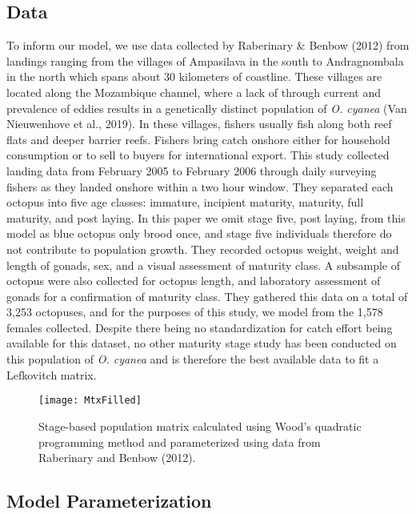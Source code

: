 \documentclass[
]{article}
\begin{document}
\hypertarget{data}{%
\subsection{Data}\label{data}}

To inform our model, we use data collected by Raberinary \& Benbow (2012) from landings ranging from the villages of Ampasilava in the south to Andragnombala in the north which spans about 30 kilometers of coastline. These villages are located along the Mozambique channel, where a lack of through current and prevalence of eddies results in a genetically distinct population of \emph{O. cyanea} (Van Nieuwenhove et al., 2019). In these villages, fishers usually fish along both reef flats and deeper barrier reefs. Fishers bring catch onshore either for household consumption or to sell to buyers for international export. This study collected landing data from February 2005 to February 2006 through daily surveying fishers as they landed onshore within a two hour window. They separated each octopus into five age classes: immature, incipient maturity, maturity, full maturity, and post laying. In this paper we omit stage five, post laying, from this model as blue octopus only brood once, and stage five individuals therefore do not contribute to population growth. They recorded octopus weight, weight and length of gonads, sex, and a visual assessment of maturity class. A subsample of octopus were also collected for octopus length, and laboratory assessment of gonads for a confirmation of maturity class. They gathered this data on a total of 3,253 octopuses, and for the purposes of this study, we model from the 1,578 females collected. Despite there being no standardization for catch effort being available for this dataset, no other maturity stage study has been conducted on this population of \emph{O. cyanea} and is therefore the best available data to fit a Lefkovitch matrix.

\begin{figure}
\texttt{[image: MtxFilled]} \caption{Stage-based population matrix calculated using Wood's quadratic programming method and parameterized using data from Raberinary and Benbow (2012). \label{WriteMtxRounded}}\label{fig:WriteMtxRounded}
\end{figure}

\hypertarget{model-parameterization}{%
\subsection{Model Parameterization}\label{model-parameterization}}
\end{document}
